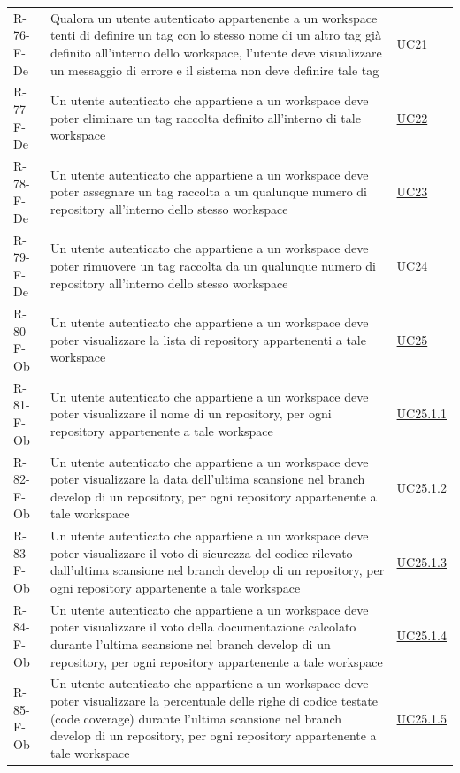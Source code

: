 \documentclass[a4paper, 11pt]{article}
\begin{document}
\begin{longtable}[c]{ >{\centering\arraybackslash}m{2.5cm} >{\centering\arraybackslash}m{8.3cm} >{\centering\arraybackslash}m{3.5cm} }
    R-76-F-De & Qualora un utente autenticato appartenente a un workspace tenti di definire un tag con lo stesso nome di un altro tag già definito all'interno dello workspace, l'utente deve visualizzare un messaggio di errore e il sistema non deve definire tale tag & \hyperref[UC21]{UC21}\\
    R-77-F-De & Un utente autenticato che appartiene a un workspace deve poter eliminare un tag raccolta definito all'interno di tale workspace & \hyperref[UC22]{UC22}\\
    R-78-F-De & Un utente autenticato che appartiene a un workspace deve poter assegnare un tag raccolta a un qualunque numero di repository all'interno dello stesso workspace & \hyperref[UC23]{UC23}\\
    R-79-F-De & Un utente autenticato che appartiene a un workspace deve poter rimuovere un tag raccolta da un qualunque numero di repository all'interno dello stesso workspace & \hyperref[UC24]{UC24}\\
    R-80-F-Ob & Un utente autenticato che appartiene a un workspace deve poter visualizzare la lista di repository appartenenti a tale workspace & \hyperref[UC25]{UC25}\\
    R-81-F-Ob & Un utente autenticato che appartiene a un workspace deve poter visualizzare il nome di un repository, per ogni repository appartenente a tale workspace & \hyperref[UC25.1.1]{UC25.1.1}\\
    R-82-F-Ob & Un utente autenticato che appartiene a un workspace deve poter visualizzare la data dell'ultima scansione nel branch develop di un repository, per ogni repository appartenente a tale workspace & \hyperref[UC25.1.2]{UC25.1.2}\\
    R-83-F-Ob & Un utente autenticato che appartiene a un workspace deve poter visualizzare il voto di sicurezza del codice rilevato dall'ultima scansione nel branch develop di un repository, per ogni repository appartenente a tale workspace & \hyperref[UC25.1.3]{UC25.1.3}\\
    R-84-F-Ob & Un utente autenticato che appartiene a un workspace deve poter visualizzare il voto della documentazione calcolato durante l'ultima scansione nel branch develop di un repository, per ogni repository appartenente a tale workspace & \hyperref[UC25.1.4]{UC25.1.4}\\
    R-85-F-Ob & Un utente autenticato che appartiene a un workspace deve poter visualizzare la percentuale delle righe di codice testate (code coverage) durante l'ultima scansione nel branch develop di un repository, per ogni repository appartenente a tale workspace & \hyperref[UC25.1.5]{UC25.1.5}\\

\end{longtable}
\end{document}
